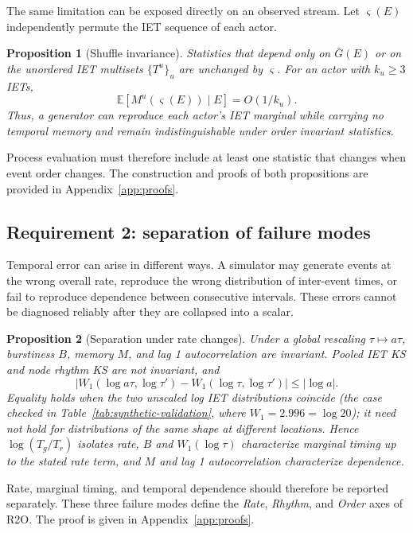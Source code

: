 \documentclass{article}
\newtheorem{proposition}{Proposition}
\newcommand{\Gagg}{\bar G}
\newcommand{\iet}{\tau}
\begin{document}
The same limitation can be exposed directly on an observed stream. Let
$\varsigma(E)$ independently permute the IET sequence of each actor.

\begin{proposition}[Shuffle invariance]
\label{prop:shuffle}
Statistics that depend only on $\Gagg(E)$ or on the unordered IET multisets
$\{T^u\}_u$ are unchanged by $\varsigma$. For an actor with $k_u\ge3$ IETs,
\[
\mathbb{E}[M^u(\varsigma(E))\mid E]=O(1/k_u).
\]
Thus, a generator can reproduce each actor's IET marginal while carrying no
temporal memory and remain indistinguishable under order invariant statistics.
\end{proposition}

Process evaluation must therefore include at least one statistic that changes
when event order changes. The construction and proofs of both propositions are
provided in Appendix~\ref{app:proofs}.

\subsection{Requirement 2: separation of failure modes}

Temporal error can arise in different ways. A simulator may generate events at
the wrong overall rate, reproduce the wrong distribution of inter-event times,
or fail to reproduce dependence between consecutive intervals. These errors
cannot be diagnosed reliably after they are collapsed into a scalar.

\begin{proposition}[Separation under rate changes]
\label{prop:separation}
Under a global rescaling $\iet\mapsto a\iet$, burstiness $B$, memory $M$, and
lag 1 autocorrelation are invariant. Pooled IET KS and node rhythm KS are not
invariant, and
\[
\left|W_1(\log a\iet,\log\iet')-W_1(\log\iet,\log\iet')\right|
\le |\log a|.
\]
Equality holds when the two unscaled log IET distributions coincide (the case
checked in Table~\ref{tab:synthetic-validation}, where $W_1 = 2.996 = \log 20$);
it need not hold for distributions of the same shape at different locations. Hence
$\log(T_g/T_r)$ isolates rate, $B$ and $W_1(\log\iet)$ characterize
marginal timing up to the stated rate term, and $M$ and lag 1 autocorrelation
characterize dependence.
\end{proposition}

Rate, marginal timing, and temporal dependence should therefore be reported
separately. These three failure modes define the \emph{Rate}, \emph{Rhythm},
and \emph{Order} axes of R2O. The proof is given in
Appendix~\ref{app:proofs}.
\end{document}
